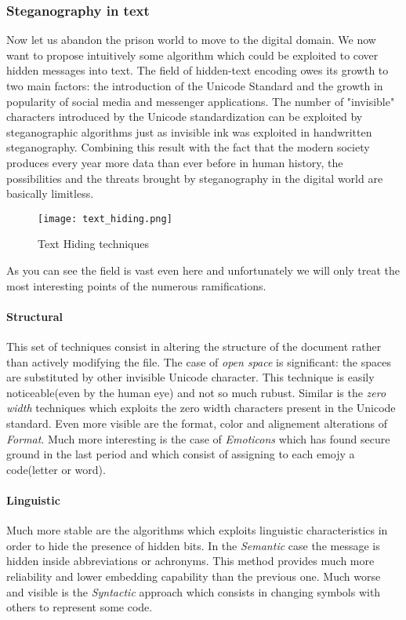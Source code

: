 \documentclass[../../main.tex]{subfiles}
\begin{document}
    \subsubsection{Steganography in text}
    Now let us abandon the prison world to move to the digital domain.
    We now want to propose intuitively some algorithm which could be exploited
    to cover hidden messages into text.
    The field of hidden-text encoding owes its growth to two main factors: the
    introduction of the Unicode Standard and the growth in popularity of social
    media and messenger applications.
    The number of "invisible" characters introduced by the Unicode
    standardization can be exploited by steganographic algorithms just as
    invisible ink was exploited in handwritten steganography.
    Combining this result with the fact that the modern society produces every
    year more data than ever before in human history, the possibilities and the
    threats brought by steganography in the digital world are basically
    limitless.

    \begin{figure}[h]
        \centering
        \caption{Text Hiding techniques}
        \texttt{[image: text\_hiding.png]}
    \end{figure}

    As you can see the field is vast even here and unfortunately we will only
    treat the most interesting points of the numerous ramifications.

    \paragraph{Structural}
    This set of techniques consist in altering the structure of the document
    rather than actively modifying the file. The case of \emph{open space} is
    significant: the spaces are substituted by other invisible Unicode
    character.
    This technique is easily noticeable(even by the human eye) and not so much
    rubust.
    Similar is the \emph{zero width} techniques which exploits the zero width
    characters present in the Unicode standard.
    Even more visible are the format, color and alignement alterations of
    \emph{Format}.
    Much more interesting is the case of \emph{Emoticons} which has found secure
    ground in the last period and which consist of assigning to each emojy a
    code(letter or word).

    \paragraph{Linguistic}
    Much more stable are the algorithms which exploits linguistic
    characteristics in order to hide the presence of hidden bits.
    In the \emph{Semantic} case the message is hidden inside abbreviations or
    achronyms.
    This method provides much more reliability and lower embedding capability
    than the previous one.
    Much worse and visible is the \emph{Syntactic} approach which consists in
    changing symbols with others to represent some code.
\end{document}
